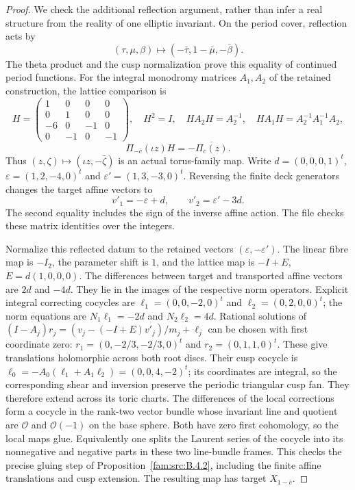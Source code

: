 \begin{proof}
We check the additional reflection argument, rather than infer a real
structure from the reality of one elliptic invariant. On the period
cover, reflection acts by
\[
 (\tau,\mu,\beta)\longmapsto(-\bar\tau,1-\bar\mu,-\bar\beta).
\]
The theta product and the cusp normalization prove this equality of
continued period functions. For the integral monodromy matrices
$A_1,A_2$ of the retained construction, the lattice comparison is
\[
 H=\begin{pmatrix}1&0&0&0\\0&1&0&0\\-6&0&-1&0\\0&-1&0&-1\end{pmatrix},
 \quad H^2=I,\quad HA_2H=A_2^{-1},\quad
 HA_1H=A_2^{-1}A_1^{-1}A_2,
\]
\[
 \Pi_{-\bar c}(\iota z)H=-\overline{\Pi_c(z)}.
\]
Thus $(z,\zeta)\mapsto(\iota z,-\bar\zeta)$ is an actual torus-family
map. Write $d=(0,0,0,1)^t$, $\varepsilon=(1,2,-4,0)^t$ and
$\varepsilon'=(1,3,-3,0)^t$. Reversing the finite deck generators
changes the target affine vectors to
\[
 v'_1=-\varepsilon+d,\qquad v'_2=\varepsilon'-3d.
\]
The second equality includes the sign of the inverse affine action.
The file  checks these matrix identities
over the integers.

Normalize this reflected datum to the retained vectors
$(\varepsilon,-\varepsilon')$. The linear fibre map is $-I_2$, the
parameter shift is $1$, and the lattice map is $-I+E$,
$E=d(1,0,0,0)$. The differences between target and transported affine
vectors are $2d$ and $-4d$. They lie in the images of the respective
norm operators. Explicit integral correcting cocycles are
$\ell_1=(0,0,-2,0)^t$ and $\ell_2=(0,2,0,0)^t$; the norm equations
are $N_1\ell_1=-2d$ and $N_2\ell_2=4d$. Rational solutions of
$(I-A_j)r_j=(v_j-(-I+E)v'_j)/m_j+\ell_j$ can be chosen with first
coordinate zero: $r_1=(0,-2/3,-2/3,0)^t$ and
$r_2=(0,1,1,0)^t$. These give translations holomorphic across both
root discs. Their cusp cocycle is
$\ell_0=-A_0(\ell_1+A_1\ell_2)=(0,0,4,-2)^t$; its coordinates are
integral, so the corresponding shear and inversion preserve the
periodic triangular cusp fan. They therefore extend across its toric
charts. The differences of the local corrections form a cocycle in
the rank-two vector bundle whose invariant line and quotient are
$\mathcal O$ and $\mathcal O(-1)$ on the base sphere. Both have zero
first cohomology, so the local maps glue. Equivalently one splits the
Laurent series of the cocycle into its nonnegative and negative
parts in these two line-bundle frames. This checks the precise
gluing step of Proposition~\ref{fam:src:B.4.2}, including the finite affine translations
and cusp extension. The resulting map has target $X_{1-\bar c}$.


\end{proof}
